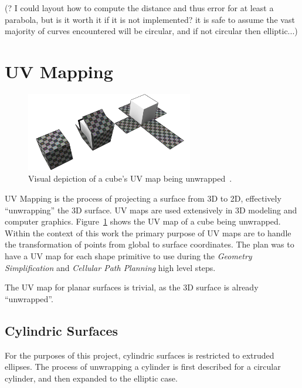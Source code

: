 (? I could layout how to compute the distance and thus error for at least a parabola, but is it worth it if it is not implemented? it is safe to assume the vast majority of curves encountered will be circular, and if not circular then elliptic...)

\section{UV Mapping}
\begin{figure}[htb]
	\centering
	\includegraphics[width=0.65\textwidth]{../resources/cube_UV_unwrapping.png}
	\caption{Visual depiction of a cube's UV map being unwrapped~\cite{UV_map_cube_img}. }
	\label{fig:uv_map_cube}
\end{figure}
UV Mapping is the process of projecting a surface from 3D to 2D, effectively ``unwrapping'' the 3D surface.
UV maps are used extensively in 3D modeling and computer graphics.
Figure~\ref{fig:uv_map_cube} shows the UV map of a cube being unwrapped.
Within the context of this work the primary purpose of UV maps are to handle the transformation of points from global to surface coordinates.
The plan was to have a UV map for each shape primitive to use during the \textit{Geometry Simplification} and \textit{Cellular Path Planning} high level steps.

The UV map for planar surfaces is trivial, as the 3D surface is already ``unwrapped''.

\subsection{Cylindric Surfaces}
For the purposes of this project, cylindric surfaces is restricted to extruded ellipses.
The process of unwrapping a cylinder is first described for a circular cylinder, and then expanded to the elliptic case.

